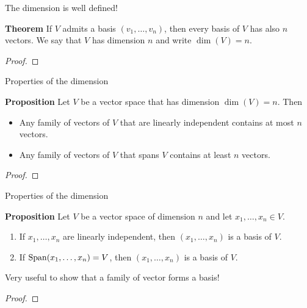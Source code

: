 \documentclass{beamer}
\begin{document}
\begin{frame}[t]{The dimension is well defined!}
	\begin{block}{\bf Theorem}
		If $V$ admits a basis $(v_1, \dots, v_n)$, then every basis of $V$ has also $n$ vectors. We say that $V$ has dimension $n$ and write $\dim(V) = n$.
	\end{block}
	\begin{proof}
		\vspace{3cm}
		\vfill
	\end{proof}
\end{frame}

\begin{frame}[t]{Properties of the dimension}
	\vspace{-0.3cm}
	\begin{block}{\bf Proposition}
		Let $V$ be a vector space that has dimension $\dim(V) = n$. Then
		\begin{itemize}
			\item Any family of vectors of $V$ that are linearly independent contains at most $n$ vectors.
			\item Any family of vectors of $V$ that spans $V$ contains at least $n$ vectors.
		\end{itemize}
	\end{block}
	\begin{proof}
		\vspace{2cm}
		\vfill
	\end{proof}
	\pause
\end{frame}


\begin{frame}[t]{Properties of the dimension}
	\vspace{-0.3cm}
	\begin{block}{\bf Proposition}
		Let $V$ be a vector space of dimension $n$ and let $x_1, \dots, x_n \in V$.
		\begin{enumerate}
			\item If $x_1, \dots, x_n$ are linearly independent, then $(x_1, \dots, x_n)$ is a basis of $V$.
			\item If ${{\rm Span}}(x_1, \dots, x_n) = V$, then $(x_1, \dots, x_n)$ is a basis of $V$.
		\end{enumerate}
	\end{block}

	\vspace{0.5cm}

	Very useful to show that a family of vector forms a basis!

	\vspace{0.5cm}

	\begin{proof}
		\vfill
	\end{proof}
\end{frame}
\end{document}

